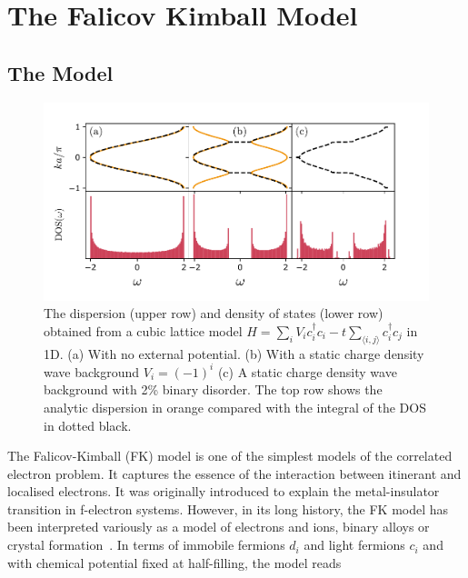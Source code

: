 \hypertarget{the-falicov-kimball-model}{%
\section{The Falicov Kimball Model}\label{the-falicov-kimball-model}}

\hypertarget{the-model}{%
\subsection{The Model}\label{the-model}}

\hypertarget{fig:simple_DOS}{%
\begin{figure}
\centering
\includegraphics[width=1\textwidth,height=\textheight]{figure_code/background_chapter/simple_DOS}
\caption[{Cubic Lattice dispersion with disorder}]{The dispersion (upper row) and density of states (lower row) obtained from a cubic lattice model \(H = \sum_{i} V_i c^\dagger_{i}c_{i} - t \sum_{\langle i,j\rangle} c^\dagger_{i}c_{j}\) in 1D. (a) With no external potential. (b) With a static charge density wave background \(V_i = (-1)^i\) (c) A static charge density wave background with 2\% binary disorder. The top row shows the analytic dispersion in orange compared with the integral of the DOS in dotted black.}
\label{fig:simple_DOS}
\end{figure}
}

The Falicov-Kimball (FK) model is one of the simplest models of the correlated electron problem. It captures the essence of the interaction between itinerant and localised electrons. It was originally introduced to explain the metal-insulator transition in f-electron systems. However, in its long history, the FK model has been interpreted variously as a model of electrons and ions, binary alloys or crystal formation~\autocite{hubbardj.ElectronCorrelationsNarrow1963,falicovSimpleModelSemiconductorMetal1969,gruberFalicovKimballModelReview1996,gruberFalicovKimballModel2006}. In terms of immobile fermions \(d_i\) and light fermions \(c_i\) and with chemical potential fixed at half-filling, the model reads

